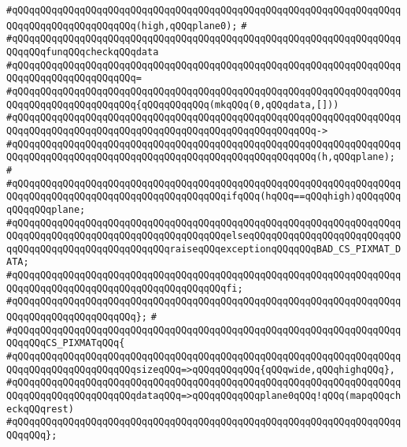 \verb|#qQQqqQQqqQQqqQQqqQQqqQQqqQQqqQQqqQQqqQQqqQQqqQQqqQQqqQQqqQQqqQQqqQQqqQQqqQQqqQQqqQQqqQQqqQQq(high,qQQqplane0);|\newline
\verb|#|\newline
\verb|#qQQqqQQqqQQqqQQqqQQqqQQqqQQqqQQqqQQqqQQqqQQqqQQqqQQqqQQqqQQqqQQqqQQqqQQqqQQqfunqQQqcheckqQQqdata|\newline
\verb|#qQQqqQQqqQQqqQQqqQQqqQQqqQQqqQQqqQQqqQQqqQQqqQQqqQQqqQQqqQQqqQQqqQQqqQQqqQQqqQQqqQQqqQQqqQQq=|\newline
\verb|#qQQqqQQqqQQqqQQqqQQqqQQqqQQqqQQqqQQqqQQqqQQqqQQqqQQqqQQqqQQqqQQqqQQqqQQqqQQqqQQqqQQqqQQqqQQq{qQQqqQQqqQQq(mkqQQq(0,qQQqdata,[]))|\newline
\verb|#qQQqqQQqqQQqqQQqqQQqqQQqqQQqqQQqqQQqqQQqqQQqqQQqqQQqqQQqqQQqqQQqqQQqqQQqqQQqqQQqqQQqqQQqqQQqqQQqqQQqqQQqqQQqqQQqqQQqqQQqqQQq->|\newline
\verb|#qQQqqQQqqQQqqQQqqQQqqQQqqQQqqQQqqQQqqQQqqQQqqQQqqQQqqQQqqQQqqQQqqQQqqQQqqQQqqQQqqQQqqQQqqQQqqQQqqQQqqQQqqQQqqQQqqQQqqQQqqQQq(h,qQQqplane);|\newline
\verb|#|\newline
\verb|#qQQqqQQqqQQqqQQqqQQqqQQqqQQqqQQqqQQqqQQqqQQqqQQqqQQqqQQqqQQqqQQqqQQqqQQqqQQqqQQqqQQqqQQqqQQqqQQqqQQqqQQqqQQqifqQQq(hqQQq==qQQqhigh)qQQqqQQqqQQqqQQqplane;|\newline
\verb|#qQQqqQQqqQQqqQQqqQQqqQQqqQQqqQQqqQQqqQQqqQQqqQQqqQQqqQQqqQQqqQQqqQQqqQQqqQQqqQQqqQQqqQQqqQQqqQQqqQQqqQQqqQQqelseqQQqqQQqqQQqqQQqqQQqqQQqqQQqqQQqqQQqqQQqqQQqqQQqqQQqqQQqraiseqQQqexceptionqQQqqQQqBAD_CS_PIXMAT_DATA;|\newline
\verb|#qQQqqQQqqQQqqQQqqQQqqQQqqQQqqQQqqQQqqQQqqQQqqQQqqQQqqQQqqQQqqQQqqQQqqQQqqQQqqQQqqQQqqQQqqQQqqQQqqQQqqQQqqQQqfi;|\newline
\verb|#qQQqqQQqqQQqqQQqqQQqqQQqqQQqqQQqqQQqqQQqqQQqqQQqqQQqqQQqqQQqqQQqqQQqqQQqqQQqqQQqqQQqqQQqqQQq};|\newline
\verb|#|\newline
\verb|#qQQqqQQqqQQqqQQqqQQqqQQqqQQqqQQqqQQqqQQqqQQqqQQqqQQqqQQqqQQqqQQqqQQqqQQqqQQqCS_PIXMATqQQq{|\newline
\verb|#qQQqqQQqqQQqqQQqqQQqqQQqqQQqqQQqqQQqqQQqqQQqqQQqqQQqqQQqqQQqqQQqqQQqqQQqqQQqqQQqqQQqqQQqqQQqsizeqQQq=>qQQqqQQqqQQq{qQQqwide,qQQqhighqQQq},|\newline
\verb|#qQQqqQQqqQQqqQQqqQQqqQQqqQQqqQQqqQQqqQQqqQQqqQQqqQQqqQQqqQQqqQQqqQQqqQQqqQQqqQQqqQQqqQQqqQQqdataqQQq=>qQQqqQQqqQQqplane0qQQq!qQQq(mapqQQqcheckqQQqrest)|\newline
\verb|#qQQqqQQqqQQqqQQqqQQqqQQqqQQqqQQqqQQqqQQqqQQqqQQqqQQqqQQqqQQqqQQqqQQqqQQqqQQq};|\newline
